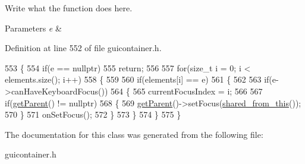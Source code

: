 Write what the function does here. 


\begin{DoxyParams}{Parameters}
{\em e} & \\
\hline
\end{DoxyParams}


Definition at line 552 of file guicontainer.\+h.


\begin{DoxyCode}
553         \{
554             \textcolor{keywordflow}{if}(e == \textcolor{keyword}{nullptr})
555                 \textcolor{keywordflow}{return};
556 
557             \textcolor{keywordflow}{for}(\textcolor{keywordtype}{size\_t} i = 0; i < elements.size(); i++)
558             \{
559 
560                 \textcolor{keywordflow}{if}(elements[i] == e)
561                 \{
562 
563                     \textcolor{keywordflow}{if}(e->canHaveKeyboardFocus())
564                     \{
565                         currentFocusIndex = i;
566 
567                         \textcolor{keywordflow}{if}(\hyperlink{classGUIElement_aded5837705c097a7a8a755df28c572e6}{getParent}() != \textcolor{keyword}{nullptr})
568                         \{
569                             \hyperlink{classGUIElement_aded5837705c097a7a8a755df28c572e6}{getParent}()->setFocus(\hyperlink{classGUIElement_a5ad5998c5b953b6c6e32b583ddf9cd97}{shared\_from\_this}());
570                         \}
571                         onSetFocus();
572                     \}
573                 \}
574             \}
575         \}
\end{DoxyCode}


The documentation for this class was generated from the following file\+:\begin{DoxyCompactItemize}
\item 
guicontainer.\+h\end{DoxyCompactItemize}
